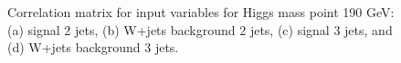 \begin{figure}[bthp!]
{}


\caption{\label{fig:FigCorr190Mu} 
Correlation matrix for input variables for Higgs mass point 190 GeV:
(a) signal 2 jets, (b) W+jets background 2 jets, 
(c) signal 3 jets, and (d) W+jets background 3 jets.
}
\end{figure}
\newpage
